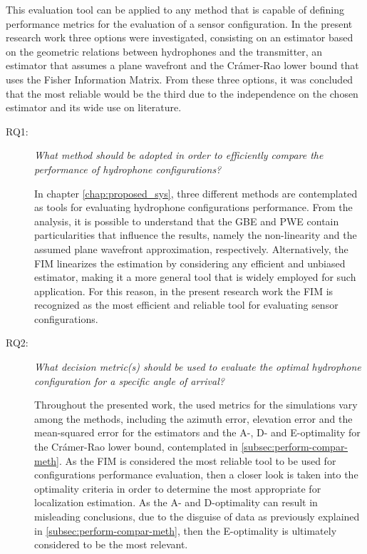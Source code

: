 This evaluation tool can be applied to any method that is capable of defining performance metrics for the evaluation of a sensor configuration. In the present research work three options were investigated, consisting on an estimator based on the geometric relations between hydrophones and the transmitter, an estimator that assumes a plane wavefront and the Crámer-Rao lower bound that uses the Fisher Information Matrix. From these three options, it was concluded that the most reliable would be the third due to the independence on the chosen estimator and its wide use on literature.

\begin{description}
	\item[RQ1: ] \textit{What method should be adopted in order to efficiently compare the performance of hydrophone configurations?}
	
	In chapter \ref{chap:proposed_sys}, three different methods are contemplated as tools for evaluating hydrophone configurations performance. From the analysis, it is possible to understand that the GBE and PWE contain  particularities that influence the results, namely the non-linearity and the assumed plane wavefront approximation, respectively. Alternatively, the FIM linearizes the estimation by considering any efficient and unbiased estimator, making it a more general tool that is widely employed for such application. For this reason, in the present research work the FIM is recognized as the most efficient and reliable tool for evaluating sensor configurations.
	
	\item[RQ2: ] \textit{What decision metric(s) should be used to evaluate the optimal hydrophone configuration for a specific angle of arrival?}
	
	Throughout the presented work, the used metrics for the simulations vary among the methods, including the azimuth error, elevation error and the mean-squared error for the estimators and the A-, D- and E-optimality for the Crámer-Rao lower bound, contemplated in \ref{subsec:perform-compar-meth}. As the FIM is considered the most reliable tool to be used for configurations performance evaluation, then a closer look is taken into the optimality criteria in order to determine the most appropriate for localization estimation. As the A- and D-optimality can result in misleading conclusions, due to the disguise of data as previously explained in \ref{subsec:perform-compar-meth}, then the E-optimality is ultimately considered to be the most relevant.
	

\end{description}

